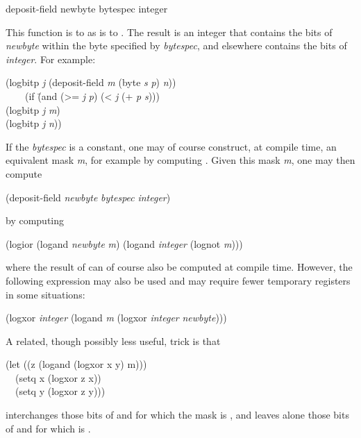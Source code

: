 \begin{defun}[Function]
deposit-field newbyte bytespec integer

This function is to  as  is to .
The result is an integer that contains the bits of \emph{newbyte}
within the byte specified by \emph{bytespec}, and elsewhere contains the bits
of \emph{integer}.
For example:
\begin{lisp}
(logbitp \emph{j} (deposit-field \emph{m} (byte \emph{s} \emph{p}) \emph{n})) \\
~~~\EQ\ (if \=(and (>= \emph{j} \emph{p}) (< \emph{j} (+ \emph{p} \emph{s}))) \\
\>(logbitp \emph{j} \emph{m}) \\
\>(logbitp \emph{j} \emph{n}))
\end{lisp}

\beforenoterule
\begin{implementation}
If the \emph{bytespec} is a constant, one may of course
construct, at compile time, an equivalent mask \emph{m}, for example
by computing .  Given
this mask \emph{m}, one may then compute
\begin{lisp}
(deposit-field \emph{newbyte} \emph{bytespec} \emph{integer})
\end{lisp}
by computing
\begin{lisp}
(logior (logand \emph{newbyte} \emph{m}) (logand \emph{integer} (lognot \emph{m})))
\end{lisp}
where the result of  can of course also be computed
at compile time.  However, the following expression
may also be used and may require fewer
temporary registers in some situations:
\begin{lisp}
(logxor \emph{integer} (logand \emph{m} (logxor \emph{integer} \emph{newbyte})))
\end{lisp}
A related, though possibly less useful, trick is that
\begin{lisp}
(let ((z (logand (logxor x y) m))) \\
~~(setq x (logxor z x)) \\
~~(setq y (logxor z y)))
\end{lisp}
interchanges those bits of  and  for which the mask  is
, and leaves alone those bits of  and  for which  is
.
\end{implementation}
\afternoterule
\end{defun}

